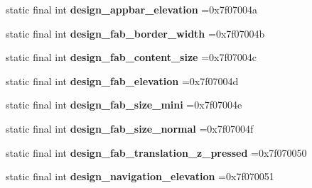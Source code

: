\begin{DoxyCompactItemize}
\item 
\hypertarget{classcheck_1_1test_1_1_r_1_1dimen_ad31ce8083e859e6bc68a4b7996bf3835}{}static final int {\bfseries design\+\_\+appbar\+\_\+elevation} =0x7f07004a\label{classcheck_1_1test_1_1_r_1_1dimen_ad31ce8083e859e6bc68a4b7996bf3835}

\item 
\hypertarget{classcheck_1_1test_1_1_r_1_1dimen_a6c311b58c9b206a8ee10e7214de4a6f8}{}static final int {\bfseries design\+\_\+fab\+\_\+border\+\_\+width} =0x7f07004b\label{classcheck_1_1test_1_1_r_1_1dimen_a6c311b58c9b206a8ee10e7214de4a6f8}

\item 
\hypertarget{classcheck_1_1test_1_1_r_1_1dimen_a6a46c93ad1554afae56846a405902617}{}static final int {\bfseries design\+\_\+fab\+\_\+content\+\_\+size} =0x7f07004c\label{classcheck_1_1test_1_1_r_1_1dimen_a6a46c93ad1554afae56846a405902617}

\item 
\hypertarget{classcheck_1_1test_1_1_r_1_1dimen_a4c357de6fa6e37fafb74283877b2ba1d}{}static final int {\bfseries design\+\_\+fab\+\_\+elevation} =0x7f07004d\label{classcheck_1_1test_1_1_r_1_1dimen_a4c357de6fa6e37fafb74283877b2ba1d}

\item 
\hypertarget{classcheck_1_1test_1_1_r_1_1dimen_a1ac0a4f5752bb60883f8bdb320ceb306}{}static final int {\bfseries design\+\_\+fab\+\_\+size\+\_\+mini} =0x7f07004e\label{classcheck_1_1test_1_1_r_1_1dimen_a1ac0a4f5752bb60883f8bdb320ceb306}

\item 
\hypertarget{classcheck_1_1test_1_1_r_1_1dimen_aa333077bf2b44581db98099c4ab185f3}{}static final int {\bfseries design\+\_\+fab\+\_\+size\+\_\+normal} =0x7f07004f\label{classcheck_1_1test_1_1_r_1_1dimen_aa333077bf2b44581db98099c4ab185f3}

\item 
\hypertarget{classcheck_1_1test_1_1_r_1_1dimen_a5d6e568d5c232efcab7663eb5f36d993}{}static final int {\bfseries design\+\_\+fab\+\_\+translation\+\_\+z\+\_\+pressed} =0x7f070050\label{classcheck_1_1test_1_1_r_1_1dimen_a5d6e568d5c232efcab7663eb5f36d993}

\item 
\hypertarget{classcheck_1_1test_1_1_r_1_1dimen_aaa923038a013e4cec7277491875dd0e9}{}static final int {\bfseries design\+\_\+navigation\+\_\+elevation} =0x7f070051\label{classcheck_1_1test_1_1_r_1_1dimen_aaa923038a013e4cec7277491875dd0e9}


\end{DoxyCompactItemize}
